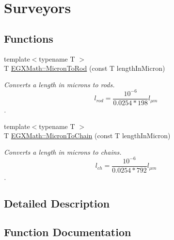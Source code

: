 \hypertarget{group___e_g_x_math-_conversions-_length_conversions-_non-_s_i-_micron-_surveyors}{}\section{Surveyors}
\label{group___e_g_x_math-_conversions-_length_conversions-_non-_s_i-_micron-_surveyors}
\subsection*{Functions}
\begin{DoxyCompactItemize}
\item 
{\footnotesize template$<$typename T $>$ }\\T \mbox{\hyperlink{group___e_g_x_math-_conversions-_length_conversions-_non-_s_i-_micron-_surveyors_gae81e23a6186148740d3b610089ba3c2e}{E\+G\+X\+Math\+::\+Micron\+To\+Rod}} (const T length\+In\+Micron)
\begin{DoxyCompactList}\small\item\em Converts a length in microns to rods. \[ l_{rod}= \frac{10^{-6}}{0.0254 * 198} l_{\mu m} \]. \end{DoxyCompactList}\item 
{\footnotesize template$<$typename T $>$ }\\T \mbox{\hyperlink{group___e_g_x_math-_conversions-_length_conversions-_non-_s_i-_micron-_surveyors_ga35d9a4c6d414802981ea103491e458bd}{E\+G\+X\+Math\+::\+Micron\+To\+Chain}} (const T length\+In\+Micron)
\begin{DoxyCompactList}\small\item\em Converts a length in microns to chains. \[ l_{ch}= \frac{10^{-6}}{0.0254 * 792} l_{\mu m} \]. \end{DoxyCompactList}\end{DoxyCompactItemize}


\subsection{Detailed Description}


\subsection{Function Documentation}
\mbox{\label{group___e_g_x_math-_conversions-_length_conversions-_non-_s_i-_micron-_surveyors_ga35d9a4c6d414802981ea103491e458bd}} 

